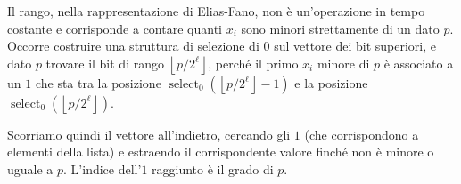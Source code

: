 \documentclass[\main/main.tex]{subfiles}
\begin{document}
\begin{definition}
    Il rango, nella rappresentazione di Elias-Fano, non è un'operazione in tempo costante e corrisponde a contare quanti \(x_i\) sono minori strettamente di un dato \(p\). Occorre costruire una struttura di selezione di \(0\) sul vettore dei bit superiori, e dato \(p\) trovare il bit di rango \(\left\lfloor p / 2^{\ell}\right\rfloor\), perché il primo \(x_i\) minore di \(p\) è associato a un \(1\) che sta tra la posizione \(\operatorname{select}_{0}\left(\left\lfloor p / 2^{\ell}\right\rfloor- 1\right)\) e la posizione \(\operatorname{select}_{0}\left(\left\lfloor p / 2^{\ell}\right\rfloor\right)\).
    
    Scorriamo quindi il vettore all'indietro, cercando gli \(1\) (che corrispondono a elementi della lista) e estraendo il corrispondente valore finché non è minore o uguale a \(p\). L'indice dell'\(1\) raggiunto è il grado di \(p\).
\end{definition}
\clearpage
\end{document}
